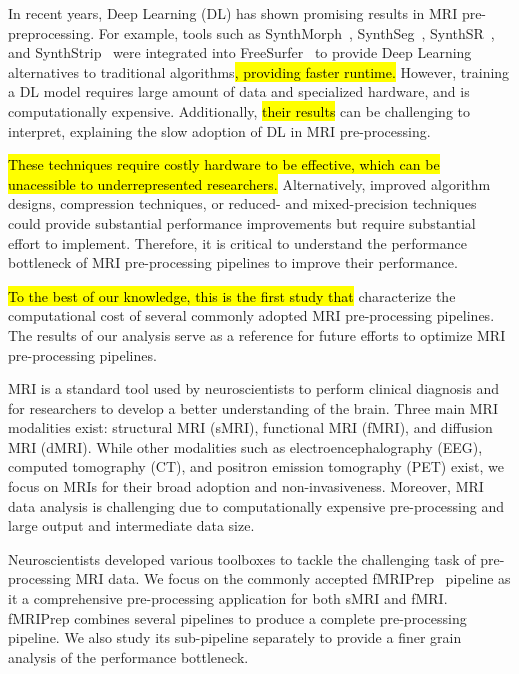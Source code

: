 \documentclass[conference]{IEEEtran}
\newcommand{\HL}[1]{\hl{#1}}
\begin{document}
In recent years, Deep Learning (DL) has shown promising results in MRI pre-preprocessing. For example, tools such as SynthMorph~\cite{Hoffmann2022-hu}, SynthSeg~\cite{Billot2023-vp}, SynthSR~\cite{Iglesias2023-bp}, and SynthStrip~\cite{Hoopes2022-ms} were integrated into FreeSurfer~\cite{Fischl2012-cx} to provide Deep Learning alternatives to traditional algorithms\HL{, providing faster runtime.}
However, training a DL model requires large amount of data and specialized hardware, and is computationally expensive. Additionally, \HL{their results} can be challenging to interpret, explaining the slow adoption of DL in MRI pre-processing.

\HL{These techniques require costly hardware to be effective, which can be unacessible to underrepresented researchers.} Alternatively, improved algorithm designs, compression techniques, or reduced- and mixed-precision techniques could provide substantial performance improvements but require substantial effort to implement. Therefore, it is critical to understand the performance bottleneck of MRI pre-processing pipelines to improve their performance.

\HL{To the best of our knowledge, this is the first study that} characterize the computational cost of several commonly adopted MRI pre-processing pipelines. The results of our analysis serve as a reference for future efforts to optimize MRI pre-processing pipelines.

MRI is a standard tool used by neuroscientists to perform clinical diagnosis and for researchers to develop a better understanding of the brain. Three main MRI modalities exist: structural MRI (sMRI), functional MRI (fMRI), and diffusion MRI (dMRI). While other modalities such as electroencephalography (EEG), computed tomography (CT), and positron emission tomography (PET) exist, we focus on MRIs for their broad adoption and non-invasiveness. Moreover, MRI data analysis is challenging due to computationally expensive pre-processing and large output and intermediate data size.

Neuroscientists developed various toolboxes to tackle the challenging task of pre-processing MRI data. We focus on the commonly accepted fMRIPrep~\cite{Esteban2019-bl} pipeline as it a comprehensive pre-processing application for both sMRI and fMRI. fMRIPrep combines several pipelines to produce a complete pre-processing pipeline. We also study its sub-pipeline separately to provide a finer grain analysis of the performance bottleneck.
\end{document}
